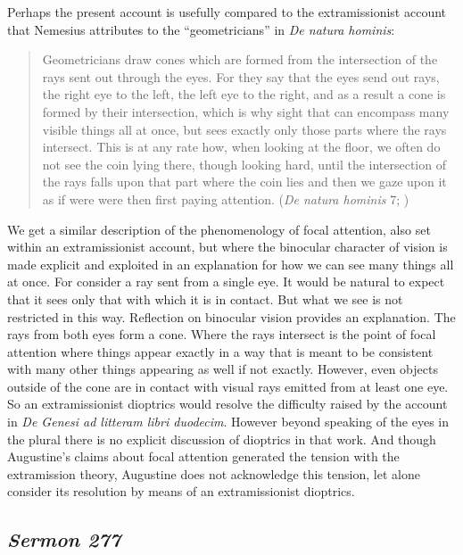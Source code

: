 \documentclass[12pt]{article}
\begin{document}
Perhaps the present account is usefully compared to the extramissionist account that Nemesius attributes to the ``geometricians'' in \emph{De natura hominis}:
\begin{quote}
	Geometricians draw cones which are formed from the intersection of the rays sent out through the eyes. For they say that the eyes send out rays, the right eye to the left, the left eye to the right, and as a result a cone is formed by their intersection, which is why sight that can encompass many visible things all at once, but sees exactly only those parts where the rays intersect. This is at any rate how, when looking at the floor, we often do not see the coin lying there, though looking hard, until the intersection of the rays falls upon that part where the coin lies and then we gaze upon it as if were were then first paying attention. (\emph{De natura hominis} 7; \citealt[104--105]{Sharples:2008aa})
\end{quote}
We get a similar description of the phenomenology of focal attention, also set within an extramissionist account, but where the binocular character of vision is made explicit and exploited in an explanation for how we can see many things all at once. For consider a ray sent from a single eye. It would be natural to expect that it sees only that with which it is in contact. But what we see is not restricted in this way. Reflection on binocular vision provides an explanation. The rays from both eyes form a cone. Where the rays intersect is the point of focal attention where things appear exactly in a way that is meant to be consistent with many other things appearing as well if not exactly. However, even objects outside of the cone are in contact with visual rays emitted from at least one eye. So an extramissionist dioptrics would resolve the difficulty raised by the account in \emph{De Genesi ad litteram libri duodecim}. However beyond speaking of the eyes in the plural there is no explicit discussion of dioptrics in that work. And though Augustine's claims about focal attention generated the tension with the extramission theory, Augustine does not acknowledge this tension, let alone consider its resolution by means of an extramissionist dioptrics.


\subsection{\emph{Sermon 277}} %
\label{sub:sermon_277}
\end{document}
